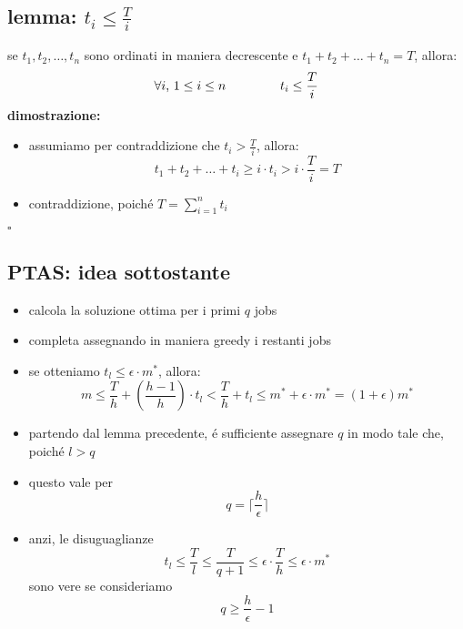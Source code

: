 \subsection*{lemma: $t_i\leq \frac{T}{i}$}
\begin{flushleft}
	se $t_1,t_2,\ldots,t_n$ sono ordinati in maniera decrescente e $t_1+t_2+\ldots+t_n=T$, allora:
		$$\forall i\text{, }1\leq i\leq n\hspace{1.5cm}t_i\leq \frac{T}{i}$$
	\textbf{dimostrazione:}
	\begin{itemize}
		\item assumiamo per contraddizione che $t_i>\frac{T}{i}$, allora:
			$$t_1+t_2+\ldots+t_i\geq i\cdot t_i>i\cdot\frac{T}{i}=T$$
		\item contraddizione, poich\'e $T=\sum_{i=1}^nt_i$
	\end{itemize}
	\hfill$\square$
\end{flushleft}


\subsection*{PTAS: idea sottostante}
\begin{flushleft}
	\begin{itemize}
		\item calcola la soluzione ottima per i primi $q$ jobs
		\item completa assegnando in maniera greedy i restanti jobs
		\item se otteniamo $t_l\leq\epsilon\cdot m^*$, allora:
			$$m\leq\frac{T}{h}+(\frac{h-1}{h})\cdot t_l<\frac{T}{h}+t_l\leq m^*+\epsilon\cdot m^*=(1+\epsilon)m^*$$
		\item partendo dal lemma precedente, \'e sufficiente assegnare $q$ in modo tale che, poich\'e $l>q$
		\item questo vale per
			$$q=\lceil\frac{h}{\epsilon}\rceil$$
		\item anzi, le disuguaglianze
			$$t_l\leq\frac{T}{l}\leq\frac{T}{q+1}\leq\epsilon\cdot\frac{T}{h}\leq\epsilon\cdot m^*$$
		sono vere se consideriamo
			$$q\geq\frac{h}{\epsilon}-1$$
	\end{itemize}
\end{flushleft}


